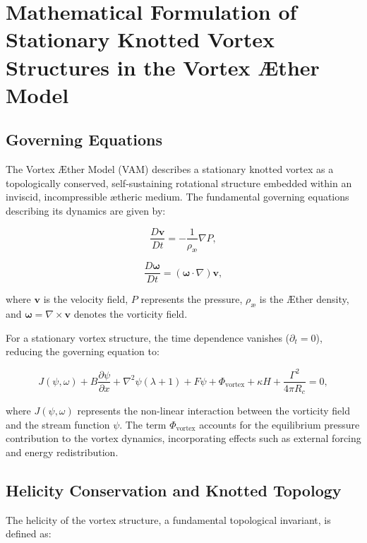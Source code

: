 
\section{Mathematical Formulation of Stationary Knotted Vortex Structures in the Vortex Æther Model}

\subsection{Governing Equations}
The Vortex Æther Model (VAM) describes a stationary knotted vortex as a topologically conserved, self-sustaining rotational structure embedded within an inviscid, incompressible ætheric medium. The fundamental governing equations describing its dynamics are given by:

\begin{equation*}
\frac{D \mathbf{v}}{Dt} = -\frac{1}{\rho_\text{\ae}} \nabla P,
\end{equation*}

\begin{equation*}
\frac{D \boldsymbol{\omega}}{Dt} = (\boldsymbol{\omega} \cdot \nabla) \mathbf{v},
\end{equation*}

where $\mathbf{v}$ is the velocity field, $P$ represents the pressure, $\rho_\text{\ae}$ is the Æther density, and $\boldsymbol{\omega} = \nabla \times \mathbf{v}$ denotes the vorticity field.

For a stationary vortex structure, the time dependence vanishes ($\partial_t = 0$), reducing the governing equation to:

\begin{equation*}
J(\psi, \omega) + B \frac{\partial \psi}{\partial x} + \nabla^2 \psi (\lambda + 1) + F \psi + \Phi_\text{vortex} + \kappa H + \frac{\Gamma^2}{4 \pi R_c} = 0,
\end{equation*}

where $J(\psi, \omega)$ represents the non-linear interaction between the vorticity field and the stream function $\psi$. The term $\Phi_\text{vortex}$ accounts for the equilibrium pressure contribution to the vortex dynamics, incorporating effects such as external forcing and energy redistribution.

\subsection{Helicity Conservation and Knotted Topology}
The helicity of the vortex structure, a fundamental topological invariant, is defined as:

